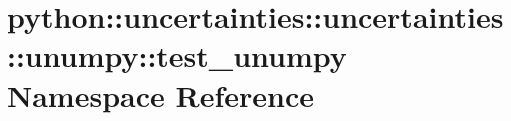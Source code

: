 \hypertarget{namespacepython_1_1uncertainties_1_1uncertainties_1_1unumpy_1_1test__unumpy}{
\section{python::uncertainties::uncertainties::unumpy::test\_\-unumpy Namespace Reference}
\label{namespacepython_1_1uncertainties_1_1uncertainties_1_1unumpy_1_1test__unumpy}
}

